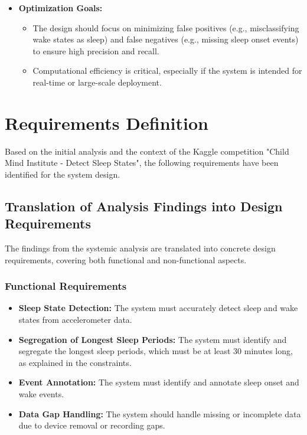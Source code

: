 \documentclass[conference]{IEEEtran}
\begin{document}
\begin{itemize}
	\item \textbf{Optimization Goals:}
	      \begin{itemize}
		      \item The design should focus on minimizing false positives (e.g., misclassifying wake states as sleep) and false negatives (e.g., missing sleep onset events) to ensure high precision and recall.
		      \item Computational efficiency is critical, especially if the system is intended for real-time or large-scale deployment.
	      \end{itemize}
\end{itemize}

\section{Requirements Definition}

Based on the initial analysis and the context of the Kaggle competition "Child Mind Institute - Detect Sleep States", the following requirements have been identified for the system design.

\subsection{Translation of Analysis Findings into Design Requirements}

The findings from the systemic analysis are translated into concrete design requirements, covering both functional and non-functional aspects.

\subsubsection{Functional Requirements}
\begin{itemize}
	\item \textbf{Sleep State Detection:} The system must accurately detect sleep and wake states from accelerometer data.
	\item \textbf{Segregation of Longest Sleep Periods:} The system must identify and segregate the longest sleep periods, which must be at least 30 minutes long, as explained in the constraints.
	\item \textbf{Event Annotation:} The system must identify and annotate sleep onset and wake events.
	\item \textbf{Data Gap Handling:} The system should handle missing or incomplete data due to device removal or recording gaps.
\end{itemize}
\end{document}
